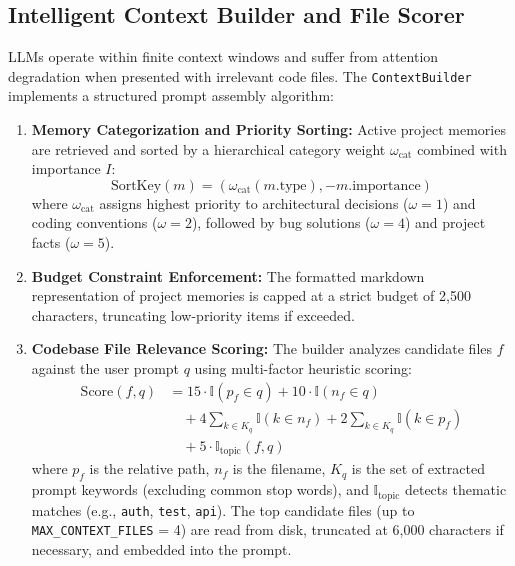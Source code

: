 \documentclass[conference]{IEEEtran}
\begin{document}
\subsection{Intelligent Context Builder and File Scorer}
LLMs operate within finite context windows and suffer from attention degradation when presented with irrelevant code files. The \texttt{ContextBuilder} implements a structured prompt assembly algorithm:
\begin{enumerate}
    \item \textbf{Memory Categorization and Priority Sorting:} Active project memories are retrieved and sorted by a hierarchical category weight $\omega_{\text{cat}}$ combined with importance $I$:
    \begin{equation}
    \text{SortKey}(m) = (\omega_{\text{cat}}(m.\text{type}), -m.\text{importance})
    \end{equation}
    where $\omega_{\text{cat}}$ assigns highest priority to architectural decisions ($\omega = 1$) and coding conventions ($\omega = 2$), followed by bug solutions ($\omega = 4$) and project facts ($\omega = 5$).
    \item \textbf{Budget Constraint Enforcement:} The formatted markdown representation of project memories is capped at a strict budget of 2,500 characters, truncating low-priority items if exceeded.
    \item \textbf{Codebase File Relevance Scoring:} The builder analyzes candidate files $f$ against the user prompt $q$ using multi-factor heuristic scoring:
    \begin{align}
    \text{Score}(f, q) &= 15 \cdot \mathbb{I}(p_f \in q) + 10 \cdot \mathbb{I}(n_f \in q) \nonumber \\
    &\quad + 4 \sum_{k \in K_q} \mathbb{I}(k \in n_f) + 2 \sum_{k \in K_q} \mathbb{I}(k \in p_f) \nonumber \\
    &\quad + 5 \cdot \mathbb{I}_{\text{topic}}(f, q)
    \end{align}
    where $p_f$ is the relative path, $n_f$ is the filename, $K_q$ is the set of extracted prompt keywords (excluding common stop words), and $\mathbb{I}_{\text{topic}}$ detects thematic matches (e.g., \texttt{auth}, \texttt{test}, \texttt{api}). The top candidate files (up to \texttt{MAX\_CONTEXT\_FILES} = 4) are read from disk, truncated at 6,000 characters if necessary, and embedded into the prompt.
\end{enumerate}
\end{document}
